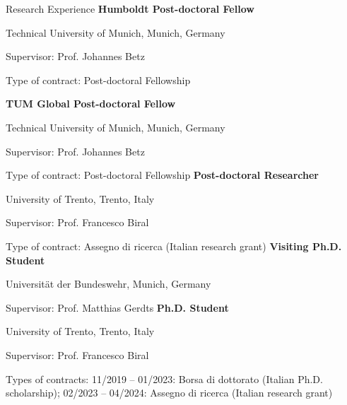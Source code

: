 \begin{rubric}{Research Experience}
\entry*[02/2026 -- present]%
	\textbf{Humboldt Post-doctoral Fellow} 
    \par Technical University of Munich, Munich, Germany
    \par Supervisor: Prof. Johannes Betz
    \par Type of contract: Post-doctoral Fellowship

\entry*[12/2024 -- 01/2026]%
	\textbf{TUM Global Post-doctoral Fellow} 
    \par Technical University of Munich, Munich, Germany
    \par Supervisor: Prof. Johannes Betz
    \par Type of contract: Post-doctoral Fellowship
%
\entry*[04/2024 -- 11/2024]%
	\textbf{Post-doctoral Researcher} 
    \par University of Trento, Trento, Italy
    \par Supervisor: Prof. Francesco Biral
    \par Type of contract: Assegno di ricerca (Italian research grant)
%
\entry*[03/2022 -- 06/2022]%
	\textbf{Visiting Ph.D. Student} 
    \par Universit{\"a}t der Bundeswehr, Munich, Germany
    \par Supervisor: Prof. Matthias Gerdts
%
\entry*[11/2019 -- 04/2024]%
	\textbf{Ph.D. Student} 
    \par University of Trento, Trento, Italy
    \par Supervisor: Prof. Francesco Biral
    \par Types of contracts: 11/2019 -- 01/2023: Borsa di dottorato (Italian Ph.D. scholarship); 02/2023 -- 04/2024: Assegno di ricerca (Italian research grant)
%
\end{rubric}
